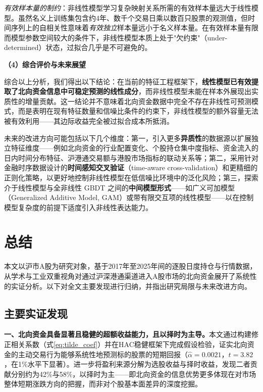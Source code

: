 \documentclass{article}
\begin{document}
\textit{有效样本量的制约}：非线性模型学习复杂映射关系所需的有效样本量远大于线性模型。虽然名义上训练集包含约4年、数千个交易日乘以数百只股票的观测值，但时间序列上的自相关性意味着\textit{有效独立}样本量远小于名义样本量。在有效样本量有限而模型参数空间较大的条件下，非线性模型本质上处于"欠约束"（under-determined）状态，过拟合几乎是不可避免的。

\vspace{0.3em}
\noindent\textbf{（4）综合评价与未来展望}

综合以上分析，我们得出以下结论：在当前的特征工程框架下，\textbf{线性模型已有效提取了北向资金信息中可稳定预测的线性成分}，而非线性模型未能在样本外展现出实质性的增量贡献。这一结论并不意味着北向资金数据中完全不存在非线性可预测模式，而是表明在现有特征数量和信噪比条件的约束下，非线性模型的额外容量无法被有效利用——其边际收益完全被过拟合成本所抵消。

未来的改进方向可能包括以下几个维度：第一，引入更多\textbf{异质性}的数据源以扩展独立特征维度——例如北向资金的行业配置变化、个股持仓集中度指标、资金流入的日内时间分布特征、沪港通交易额与港股市场指标的联动关系等；第二，采用针对金融时序数据设计的\textbf{时间感知交叉验证}（time-aware cross-validation）和更精细的正则化策略，以更好地控制非线性模型在低信噪比环境中的泛化风险；第三，探索介于线性模型与全非线性 GBDT 之间的\textbf{中间模型形式}——如广义可加模型（Generalized Additive Model, GAM）或带有限交互项的线性模型——以在控制模型复杂度的前提下适度引入非线性表达能力。

\newpage
\section{总结}

本文以沪市A股为研究对象，基于2017年至2025年间的逐股日度持仓与行情数据，从学术与工业双重视角对通过沪深港通渠道进入A股市场的北向资金展开了系统性的实证分析。以下对全文主要发现进行归纳，并指出研究局限与未来改进方向。

\subsection*{主要实证发现}

\textbf{一、北向资金具备显著且稳健的超额收益能力，且以择时为主导。}本文通过构建修正相关系数（式\ref{eq:tilde_coef}）并在HAC稳健框架下完成假设检验，证实北向资金的主动交易行为能够系统性地预测标的股票的短期回报（$\hat{\alpha} = 0.0021$，$t = 3.82$，在1\%水平下显著）。进一步将盈利来源分解为选股收益与择时收益，发现二者贡献分别约为42\%与58\%，以择时为主——即北向资金的信息优势更多体现在对市场整体短期涨跌方向的把握，而非对个股基本面差异的深度挖掘。
\end{document}
